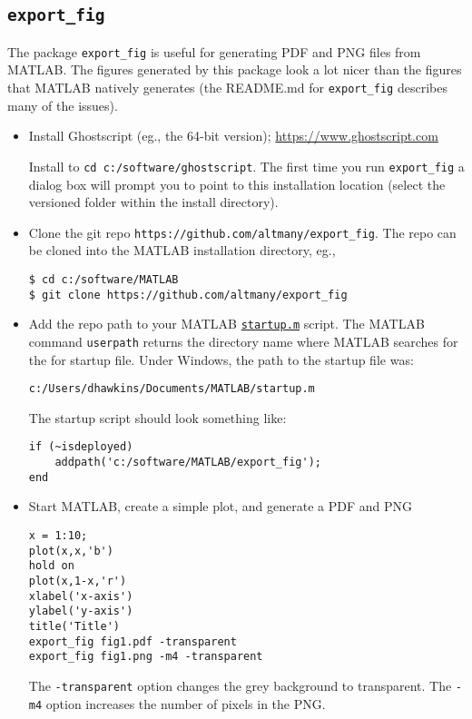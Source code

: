 \documentclass[10pt,twoside]{article}
\begin{document}
\subsection*{\texttt{export\_fig}}

The package \verb+export_fig+ is useful for generating PDF and PNG files from
MATLAB. The figures generated by this package look a lot nicer than the 
figures that MATLAB natively generates (the README.md for \verb+export_fig+
describes many of the issues).
%
\begin{itemize}
\item Install Ghostscript (eg., the 64-bit version);
\href{https://www.ghostscript.com}{https://www.ghostscript.com}

Install to \verb+cd c:/software/ghostscript+. The first time you run
\verb+export_fig+ a dialog box will prompt you to point to this installation
location (select the versioned folder within the install directory).

\item Clone the git repo \verb+https://github.com/altmany/export_fig+.
The repo can be cloned into the MATLAB installation directory, eg., 

\begin{verbatim}
$ cd c:/software/MATLAB
$ git clone https://github.com/altmany/export_fig
\end{verbatim}

\item Add the repo path to your MATLAB 
\href{https://www.mathworks.com/help/matlab/ref/startup.html}
{\texttt{startup.m}} script. The MATLAB command \verb+userpath+
returns the directory name where MATLAB searches for the for
startup file. Under Windows, the path to the startup file was:

\begin{verbatim}
c:/Users/dhawkins/Documents/MATLAB/startup.m
\end{verbatim}

The startup script should look something like:
%
\begin{verbatim}
if (~isdeployed)
    addpath('c:/software/MATLAB/export_fig');
end
\end{verbatim}

\item Start MATLAB, create a simple plot, and generate a PDF and PNG

\begin{verbatim}
x = 1:10;
plot(x,x,'b')
hold on
plot(x,1-x,'r')
xlabel('x-axis')
ylabel('y-axis')
title('Title')
export_fig fig1.pdf -transparent
export_fig fig1.png -m4 -transparent
\end{verbatim}

The \verb+-transparent+ option changes the grey background to transparent.
The \verb+-m4+ option increases the number of pixels in the PNG.

\end{itemize}
\end{document}
